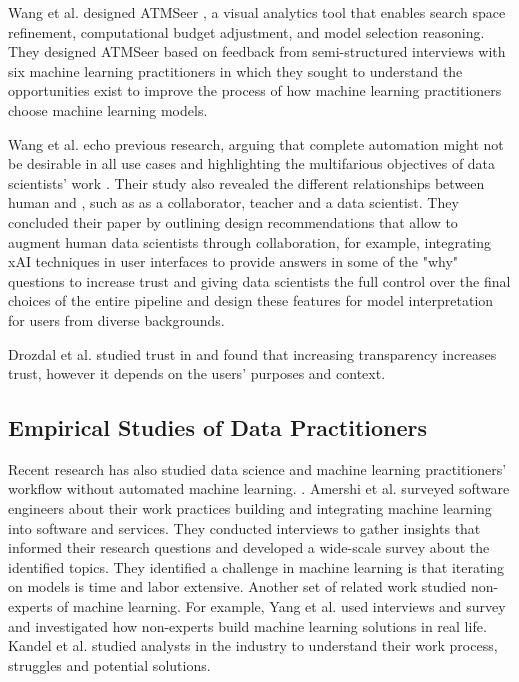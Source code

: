 
Wang et al. designed ATMSeer \cite{wang2018atmseer}, a visual analytics tool that enables search space refinement, computational budget adjustment, and model selection reasoning.  They designed ATMSeer based on feedback from semi-structured interviews with six machine learning practitioners in which they sought to understand the opportunities exist to improve the process of how machine learning practitioners choose machine learning models.  

Wang et al. echo previous research, arguing that complete automation might not be desirable in all use cases and highlighting the multifarious objectives of data scientists' work \cite{DakuoCSCW2019}. Their study also revealed the different relationships between human and \automl, such as \automl as a collaborator, teacher and a data scientist. They concluded their paper by outlining design recommendations that allow \automl to augment human data scientists through collaboration, for example, integrating xAI techniques in \automl user interfaces to provide answers in some of the "why" questions to increase trust and giving data scientists the full control over the final choices of the entire pipeline and design these features for model interpretation for users from diverse backgrounds. 

Drozdal et al. studied trust in \automl and found that increasing transparency increases trust, however it depends on the users' purposes and context. \cite{DrozdalTrustAutoml}

\subsection{Empirical Studies of Data Practitioners}
Recent research has also studied data science and machine learning practitioners' workflow without automated machine learning. \cite{}. Amershi et al. surveyed software engineers about their work practices building and integrating machine learning into software and services. They conducted interviews to gather insights that informed their research questions and developed a wide-scale survey about the identified topics. They identified a challenge in machine learning is that iterating on models is time and labor extensive. Another set of related work studied non-experts of machine learning. For example, Yang et al. used interviews and survey and investigated how non-experts build machine learning solutions in real life. \cite{YangNonExpert} Kandel et al. studied analysts in the industry to understand their work process, struggles and potential solutions. \cite{Kandel}

